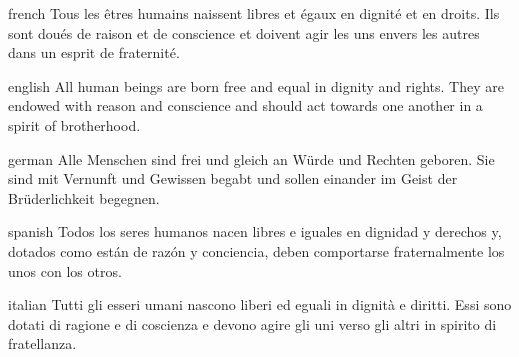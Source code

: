 \documentclass{article}
\begin{document}
\begin{conditext}{french}
Tous les êtres humains naissent libres et égaux en dignité et en
droits. Ils sont doués de raison et de conscience et doivent agir
les uns envers les autres dans un esprit de fraternité.
\end{conditext}

\begin{conditext}{english}
All human beings are born free and equal in dignity and rights. They
are endowed with reason and conscience and should act towards one
another in a spirit of brotherhood.
\end{conditext}

\begin{conditext}{german}
Alle Menschen sind frei und gleich an Würde und Rechten geboren.
Sie sind mit Vernunft und Gewissen begabt und sollen einander im
Geist der Brüderlichkeit begegnen.
\end{conditext}

\begin{conditext}{spanish}
Todos los seres humanos nacen libres e iguales en dignidad y derechos
y, dotados como están de razón y conciencia, deben comportarse fraternalmente
los unos con los otros.
\end{conditext}

\begin{conditext}{italian}
Tutti gli esseri umani nascono liberi ed eguali in dignità e diritti.
Essi sono dotati di ragione e di coscienza e devono agire gli uni
verso gli altri in spirito di fratellanza.
\end{conditext}
\end{document}
